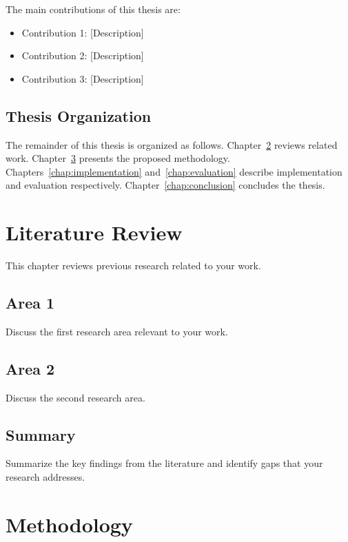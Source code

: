 \documentclass[12pt, oneside]{book}
\theoremstyle{definition}
\theoremstyle{remark}
\begin{document}
The main contributions of this thesis are:
\begin{itemize}
    \item Contribution 1: [Description]
    \item Contribution 2: [Description]
    \item Contribution 3: [Description]
\end{itemize}

\section{Thesis Organization}
\label{sec:organization}

The remainder of this thesis is organized as follows. Chapter~\ref{chap:literature} 
reviews related work. Chapter~\ref{chap:methodology} presents the proposed methodology. 
Chapters~\ref{chap:implementation} and~\ref{chap:evaluation} describe implementation 
and evaluation respectively. Chapter~\ref{chap:conclusion} concludes the thesis.

\chapter{Literature Review}
\label{chap:literature}

This chapter reviews previous research related to your work.

\section{Area 1}
\label{sec:area1}

Discuss the first research area relevant to your work.

\section{Area 2}
\label{sec:area2}

Discuss the second research area.

\section{Summary}
\label{sec:lit-summary}

Summarize the key findings from the literature and identify gaps that your 
research addresses.

\chapter{Methodology}
\label{chap:methodology}
\end{document}
